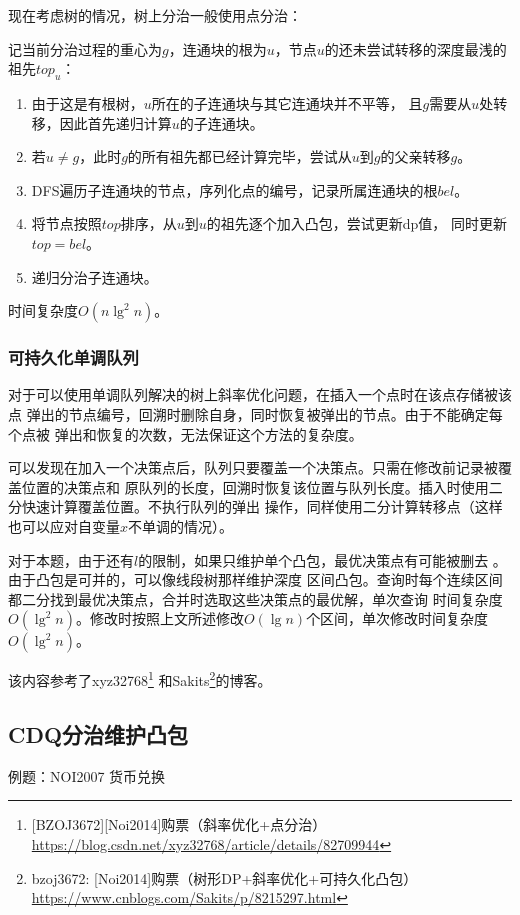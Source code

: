 现在考虑树的情况，树上分治一般使用点分治：

记当前分治过程的重心为$g$，连通块的根为$u$，节点$u$的还未尝试转移的深度最浅的祖先$top_u$：
\begin{enumerate}
    \item 由于这是有根树，$u$所在的子连通块与其它连通块并不平等，
    且$g$需要从$u$处转移，因此首先递归计算$u$的子连通块。
    \item 若$u\neq g$，此时$g$的所有祖先都已经计算完毕，尝试从$u$到$g$的父亲转移$g$。
    \item DFS遍历子连通块的节点，序列化点的编号，记录所属连通块的根$bel$。
    \item 将节点按照$top$排序，从$u$到$u$的祖先逐个加入凸包，尝试更新dp值，
    同时更新$top=bel$。
    \item 递归分治子连通块。
\end{enumerate}

时间复杂度$O(n\lg^2 n)$。
\subsubsection{可持久化单调队列}
对于可以使用单调队列解决的树上斜率优化问题，在插入一个点时在该点存储被该点
弹出的节点编号，回溯时删除自身，同时恢复被弹出的节点。由于不能确定每个点被
弹出和恢复的次数，无法保证这个方法的复杂度。

可以发现在加入一个决策点后，队列只要覆盖一个决策点。只需在修改前记录被覆盖位置的决策点和
原队列的长度，回溯时恢复该位置与队列长度。插入时使用二分快速计算覆盖位置。不执行队列的弹出
操作，同样使用二分计算转移点（这样也可以应对自变量$x$不单调的情况）。

对于本题，由于还有$l$的限制，如果只维护单个凸包，最优决策点有可能被删去
。由于凸包是可并的，可以像线段树那样维护深度
区间凸包。查询时每个连续区间都二分找到最优决策点，合并时选取这些决策点的最优解，单次查询
时间复杂度$O(\lg^2 n)$。修改时按照上文所述修改$O(\lg n)$个区间，单次修改时间复杂度
$O(\lg^2 n)$。

该内容参考了xyz32768\footnote{
    [BZOJ3672][Noi2014]购票（斜率优化+点分治）\\
    \url{https://blog.csdn.net/xyz32768/article/details/82709944}
}
和Sakits\footnote{
    bzoj3672: [Noi2014]购票（树形DP+斜率优化+可持久化凸包）\\
    \url{https://www.cnblogs.com/Sakits/p/8215297.html}
}的博客。
\subsection{CDQ分治维护凸包}
例题：NOI2007 货币兑换

